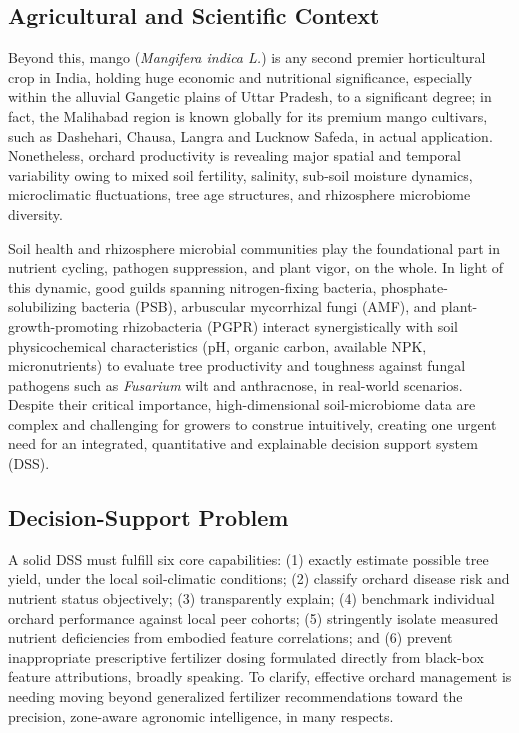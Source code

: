 \documentclass[runningheads,a4paper,oribibl]{llncs}
\begin{document}
\subsection{Agricultural and Scientific Context}
Beyond this, mango (\textit{Mangifera indica L.}) is any second premier horticultural crop in India\cite{berendsen2012,mendes2011}, holding huge economic and nutritional significance, especially within the alluvial Gangetic plains of Uttar Pradesh, to a significant degree; in fact, the Malihabad region is known globally for its premium mango cultivars, such as Dashehari, Chausa, Langra and Lucknow Safeda, in actual application. Nonetheless, orchard productivity is revealing major spatial and temporal variability owing to mixed soil fertility, salinity, sub-soil moisture dynamics, microclimatic fluctuations\cite{bouskill2013}, tree age structures, and rhizosphere microbiome diversity\cite{singh2020}.

Soil health and rhizosphere microbial communities play the foundational part in nutrient cycling, pathogen suppression, and plant vigor, on the whole. In light of this dynamic, good guilds spanning nitrogen-fixing bacteria, phosphate-solubilizing bacteria (PSB), arbuscular mycorrhizal fungi (AMF), and plant-growth-promoting rhizobacteria (PGPR) interact synergistically with soil physicochemical characteristics (pH, organic carbon, available NPK, micronutrients) to evaluate tree productivity and toughness against fungal pathogens such as \textit{Fusarium} wilt and anthracnose, in real-world scenarios. Despite their critical importance, high-dimensional soil-microbiome data are complex and challenging\cite{fierer2017,bahram2018} for growers to construe intuitively, creating one urgent need for an integrated, quantitative and explainable decision support system (DSS).

\subsection{Decision-Support Problem}
A solid DSS must fulfill six core capabilities: (1) exactly estimate possible tree yield, under the local soil-climatic conditions; (2) classify orchard disease risk and nutrient status objectively; (3) transparently explain; (4) benchmark individual orchard performance against local peer cohorts; (5) stringently isolate measured nutrient deficiencies from embodied feature correlations; and (6) prevent inappropriate prescriptive fertilizer dosing formulated directly from black-box feature attributions, broadly speaking. To clarify, effective orchard management is needing moving beyond generalized fertilizer recommendations toward the precision, zone-aware agronomic intelligence, in many respects.
\end{document}
